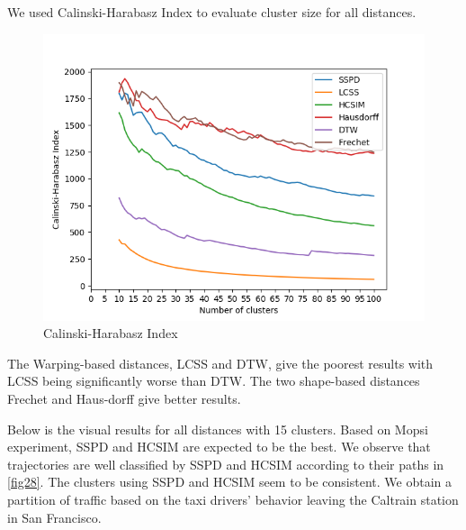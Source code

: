 \documentclass[a4paper, 12pt]{article}
\begin{document}
We used Calinski-Harabasz Index \citep{calinski1974dendrite} to evaluate cluster size for all distances.

\begin{figure}[ht]
    \centering
    \includegraphics[width=1\textwidth]{calinski harabasz.png}
    \caption{Calinski-Harabasz Index}
    \label{fig27}
\end{figure}

\pagebreak

The Warping-based distances, LCSS and DTW, give the poorest results with LCSS being significantly worse than DTW. The two shape-based distances Frechet and Haus-dorff give better results.

Below is the visual results for all distances with 15 clusters. Based on Mopsi experiment, SSPD and HCSIM are expected to be the best. We observe that trajectories are well classified by SSPD and HCSIM according to their paths in \ref{fig28}. The clusters using SSPD and HCSIM seem to be consistent. We obtain a partition of traffic based on the taxi drivers’ behavior leaving the Caltrain station in San Francisco.

\pagebreak
\end{document}
